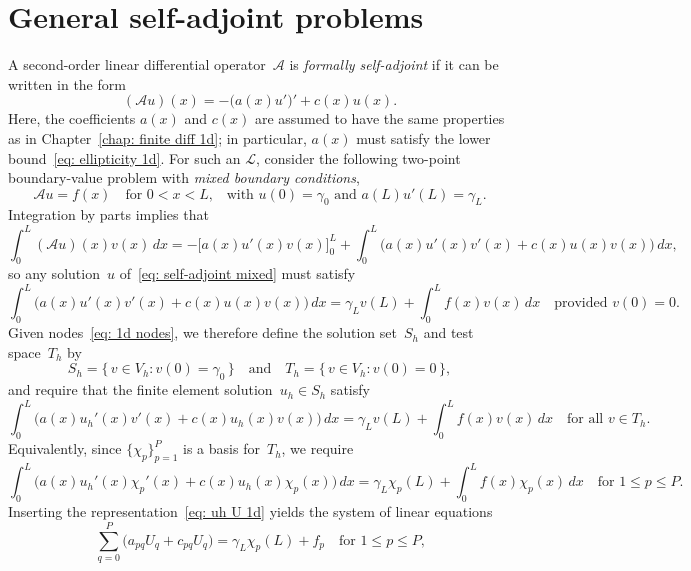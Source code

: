 \section{General self-adjoint problems}\label{sec: self-adjoint 1d}
A second-order linear differential operator~$\mathcal{A}$ is 
\emph{formally self-adjoint} if it can be written in the form
\begin{equation}\label{eq: L self-adjoint}
(\mathcal{A}u)(x)=-\bigl(a(x)u'\bigr)'+c(x)u(x).
\end{equation}
Here, the coefficients $a(x)$ and $c(x)$ are assumed to have the same 
properties as in Chapter~\ref{chap: finite diff 1d}; in particular, $a(x)$ must 
satisfy the lower bound~\eqref{eq: ellipticity 1d}. For such an $\mathcal{L}$, 
consider the following two-point boundary-value problem with \emph{mixed 
boundary conditions},
\begin{equation}\label{eq: self-adjoint mixed}
\mathcal{A}u=f(x)\quad\text{for $0<x<L$,}\quad
\text{with $u(0)=\gamma_0$ and $a(L)u'(L)=\gamma_L$.}
\end{equation}
Integration by parts implies that
\begin{equation}\label{eq: Lu v by parts}
\int_0^L(\mathcal{A}u)(x)v(x)\,dx
    =-\bigl[a(x)u'(x)v(x)\bigr]_0^L+\int_0^L\bigl(a(x)u'(x)v'(x)+c(x)u(x)v(x)
        \bigr)\,dx,
\end{equation}
so any solution~$u$ of~\eqref{eq: self-adjoint mixed} must satisfy
\begin{equation}\label{eq: Lu=f weak 1d}
\int_0^L\bigl(a(x)u'(x)v'(x)+c(x)u(x)v(x)\bigr)\,dx
    =\gamma_Lv(L)+\int_0^Lf(x)v(x)\,dx
    \quad\text{provided $v(0)=0$.}
\end{equation}
Given nodes~\eqref{eq: 1d nodes}, we therefore define the solution set~$S_h$ 
and test space~$T_h$ by
\[
S_h=\{\,v\in V_h:v(0)=\gamma_0\,\}
\quad\text{and}\quad
T_h=\{\,v\in V_h:v(0)=0\,\},
\]
and require that the finite element solution~$u_h\in S_h$ satisfy
\begin{equation}\label{eq: self-adjoint mixed bc FEM}
\int_0^L\bigl(a(x)u_h'(x)v'(x)+c(x)u_h(x)v(x)\bigr)\,dx
    =\gamma_Lv(L)+\int_0^Lf(x)v(x)\,dx
    \quad\text{for all $v\in T_h$.}
\end{equation}
Equivalently, since $\{\chi_p\}_{p=1}^P$ is a basis for~$T_h$, we require
\[
\int_0^L\bigl(a(x)u_h'(x)\chi_p'(x)+c(x)u_h(x)\chi_p(x)\bigr)\,dx
    =\gamma_L\chi_p(L)+\int_0^Lf(x)\chi_p(x)\,dx
    \quad\text{for $1\le p\le P$.}
\]
Inserting the representation~\eqref{eq: uh U 1d} yields the system of linear 
equations
\[
\sum_{q=0}^P\bigl(a_{pq}U_q+c_{pq}U_q\bigr)=\gamma_L\chi_p(L)+f_p
    \quad\text{for $1\le p\le P$,}
\]
